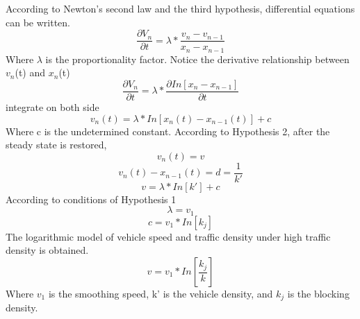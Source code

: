 According to Newton's second law and the third hypothesis, differential equations can be written.
\begin{equation} \frac{\partial V_n}{\partial t} =\lambda  *\frac{v_n-v_{n-1}}{x_n-x_{n-1}} \end{equation}
Where $\lambda$ is the proportionality factor. Notice the derivative relationship between $v_n$(t) and $x_n$(t)
\begin{equation} \frac{\partial V_n}{\partial t} =\lambda *\frac{\partial In[x_n-x_{n-1}]}{\partial t}\end{equation}
integrate on both side
\begin{equation} v_n(t) =\lambda * In[x_n(t)-x_{n-1}(t)]+c\end{equation}
Where c is the undetermined constant.
According to Hypothesis 2, after the steady state is restored, 
\begin{equation} v_n(t) =v\end{equation}
\begin{equation} v_n(t) -x_{n-1}(t)=d=\frac{1}{k'}\end{equation}
\begin{equation} v =\lambda * In[k']+c\end{equation}
According to conditions of Hypothesis 1
\begin{equation} \lambda =v_1\end{equation}
\begin{equation} c =v_1 * In[k_j]\end{equation}
The logarithmic model of vehicle speed and traffic density under high traffic density is obtained.
\begin{equation} v =v_1 * In[\frac{k_j}{k}]\end{equation}
Where $v_1$ is the smoothing speed, k' is the vehicle density, and $k_j$ is the blocking density.
